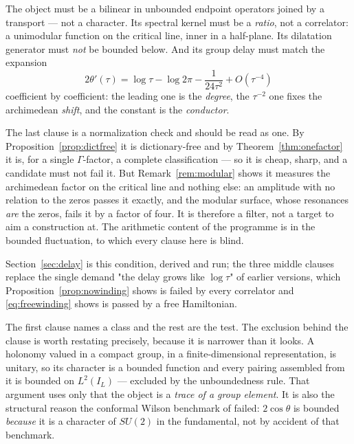 \begin{condition}\label{cond:bilinear}
The object must be a bilinear in unbounded endpoint operators joined by a
transport --- not a character. Its spectral kernel must be a \emph{ratio}, not a
correlator: a unimodular function on the critical line, inner in a half-plane.
Its dilatation generator must \emph{not} be bounded below. And its group delay
must match the expansion
\[
 2\theta'(\tau)=\log\tau-\log2\pi-\frac1{24\tau^2}+O(\tau^{-4})
\]
coefficient by coefficient: the leading one is the \emph{degree}, the $\tau^{-2}$
one fixes the archimedean \emph{shift}, and the constant is the \emph{conductor}.
\end{condition}

The last clause is a normalization check and should be read as one. By
Proposition~\ref{prop:dictfree} it is dictionary-free and by
Theorem~\ref{thm:onefactor} it is, for a single $\Gamma$-factor, a complete
classification --- so it is cheap, sharp, and a candidate must not fail it. But
Remark~\ref{rem:modular} shows it measures the archimedean factor on the critical
line and nothing else: an amplitude with no relation to the zeros passes it
exactly, and the modular surface, whose resonances \emph{are} the zeros, fails it
by a factor of four. It is therefore a filter, not a target to aim a construction
at. The arithmetic content of the programme is in the bounded fluctuation, to
which every clause here is blind.

Section~\ref{sec:delay} is this condition, derived and run; the three middle
clauses replace the single demand "the delay grows like $\log\tau$" of earlier
versions, which Proposition~\ref{prop:nowinding} shows is failed by every
correlator and \eqref{eq:freewinding} shows is passed by a free Hamiltonian.

The first clause names a class and the rest are the test. The exclusion behind
the clause is worth restating precisely, because it is narrower than it looks. A
holonomy valued in a compact group, in a finite-dimensional representation, is
unitary, so its character is a bounded function and every pairing assembled from
it is bounded on $L^2(I_L)$ --- excluded by the unboundedness rule. That argument
uses only that the object is a \emph{trace of a group element}. It is also the
structural reason the conformal Wilson benchmark of \cite{Selection} failed:
$2\cos\theta$ is bounded \emph{because} it is a character of $SU(2)$ in the
fundamental, not by accident of that benchmark.

